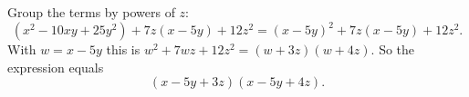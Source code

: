 Group the terms by powers of $z$:
\[
\left(x^2-10xy+25y^2\right)+7z(x-5y)+12z^2=(x-5y)^2+7z(x-5y)+12z^2 .
\]
With $w=x-5y$ this is $w^2+7wz+12z^2=(w+3z)(w+4z)$. So the expression equals
\[
\boxed{(x-5y+3z)(x-5y+4z)}.
\]
